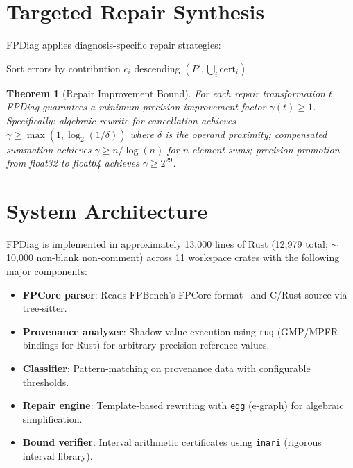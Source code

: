 \documentclass[11pt]{article}
\newtheorem{theorem}{Theorem}
\begin{document}
\section{Targeted Repair Synthesis}
\label{sec:repair}

FPDiag applies diagnosis-specific repair strategies:

\begin{algorithm}[t]
\SetAlgoLined
{}
Sort errors by contribution $c_i$ descending\;
\Return $(P', \bigcup_i \text{cert}_i)$\;
\caption{Diagnosis-Guided Repair}
\end{algorithm}

\begin{theorem}[Repair Improvement Bound]
\label{thm:repair}
For each repair transformation $t$, FPDiag guarantees a minimum precision improvement factor $\gamma(t) \geq 1$. Specifically: algebraic rewrite for cancellation achieves $\gamma \geq \max(1, \log_2(1/\delta))$ where $\delta$ is the operand proximity; compensated summation achieves $\gamma \geq n/\log(n)$ for $n$-element sums; precision promotion from float32 to float64 achieves $\gamma \geq 2^{29}$.
\end{theorem}

\section{System Architecture}
\label{sec:system}

FPDiag is implemented in approximately 13,000 lines of Rust (12,979 total; $\sim$10,000 non-blank non-comment) across 11 workspace crates with the following major components:
\begin{itemize}
\item \textbf{FPCore parser}: Reads FPBench's FPCore format~\cite{fpbench} and C/Rust source via tree-sitter.
\item \textbf{Provenance analyzer}: Shadow-value execution using \texttt{rug} (GMP/MPFR bindings for Rust) for arbitrary-precision reference values.
\item \textbf{Classifier}: Pattern-matching on provenance data with configurable thresholds.
\item \textbf{Repair engine}: Template-based rewriting with \texttt{egg} (e-graph) for algebraic simplification.
\item \textbf{Bound verifier}: Interval arithmetic certificates using \texttt{inari} (rigorous interval library).
\end{itemize}
\end{document}
